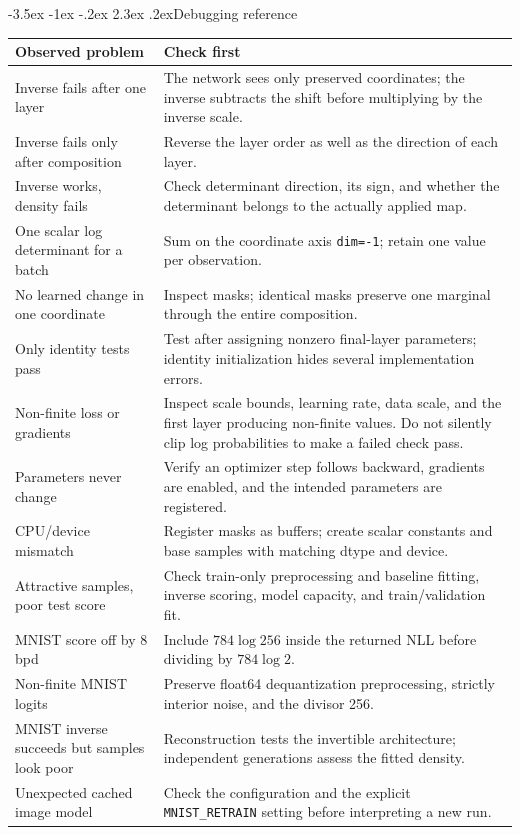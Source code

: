 \documentclass[11pt,a4paper]{article}
\makeatletter
\renewcommand\section{\@startsection{section}{1}{\z@}%
  {-3.5ex \@plus -1ex \@minus -.2ex}%
  {2.3ex \@plus .2ex}{\normalfont\Large}}
\makeatother
\begin{document}
\section{Debugging reference}
\begin{center}
\begin{tabular}{@{}p{44mm}p{113mm}@{}}
\toprule
Observed problem & Check first \\
\midrule
Inverse fails after one layer & The network sees only preserved coordinates;
the inverse subtracts the shift before multiplying by the inverse scale. \\
{\raggedright Inverse fails only after composition\par} & Reverse the layer order as well as
the direction of each layer. \\
Inverse works, density fails & Check determinant direction, its sign, and
whether the determinant belongs to the actually applied map. \\
{\raggedright One scalar log determinant for a batch\par} & Sum on the coordinate axis
\texttt{dim=-1}; retain one value per observation. \\
No learned change in one coordinate & Inspect masks; identical masks preserve
one marginal through the entire composition. \\
Only identity tests pass & Test after assigning nonzero final-layer parameters;
identity initialization hides several implementation errors. \\
Non-finite loss or gradients & Inspect scale bounds, learning rate, data scale,
and the first layer producing non-finite values. Do not silently clip log
probabilities to make a failed check pass. \\
Parameters never change & Verify an optimizer step follows backward,
gradients are enabled, and the intended parameters are registered. \\
CPU/device mismatch & Register masks as buffers; create scalar constants and
base samples with matching dtype and device. \\
Attractive samples, poor test score & Check train-only preprocessing and
baseline fitting, inverse scoring, model capacity, and train/validation fit. \\
MNIST score off by 8 bpd & Include $784\log256$ inside the returned NLL
before dividing by $784\log2$. \\
Non-finite MNIST logits & Preserve float64 dequantization preprocessing,
strictly interior noise, and the divisor 256. \\
{\raggedright MNIST inverse succeeds but samples look poor\par} & Reconstruction tests the
invertible architecture; independent generations assess the fitted density. \\
Unexpected cached image model & Check the configuration and the explicit
\texttt{MNIST\_RETRAIN} setting before interpreting a new run. \\
\bottomrule
\end{tabular}
\end{center}
\end{document}
